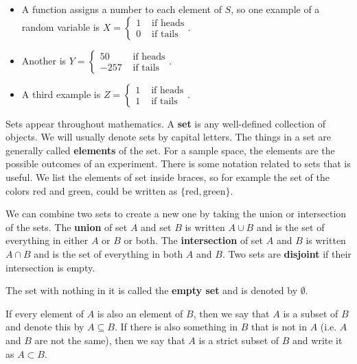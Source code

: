 \begin{frame}[allowframebreaks]
\begin{itemize}
\item A function assigns a number
to each element of $S$, so one example of a
random variable is $X = \begin{cases} 1 & \text{ if heads} \\
  0 & \text{ if tails} \end{cases}$. 

\item Another is
$Y = \begin{cases} 50 & \text{ if heads} \\
  -257 & \text{ if tails} \end{cases}$. 

\item A third example is
$Z = \begin{cases} 1 & \text{ if heads} \\
  1 & \text{ if tails} \end{cases}$.
\end{itemize}
\end{frame}

\begin{mdframed}[frametitle={Sets}]
Sets appear throughout mathematics. A \textbf{set} is any well-defined
collection of objects. We will usually denote sets by capital
letters. The things in a set are generally called \textbf{elements} of
the set. For a sample space, the elements are the possible outcomes of
an experiment. There is some notation related to sets that is
useful. We list the elements of set inside braces, so for example the
set of the colors red and green, could be written as
$\{\mathrm{red},\mathrm{green}\}$.

We can combine two sets to create a new one by taking the union or
intersection of the sets. The \textbf{union} of set $A$ and set $B$ is
written $A \cup B$ and is the set of everything in either $A$ or $B$
or both. The \textbf{intersection} of set $A$ and $B$ is written $A
\cap B$ and is the set of everything in both $A$ and $B$.  Two sets
are \textbf{disjoint} if their intersection is empty.

The set with nothing in it is called the \textbf{empty set} and is
denoted by $\emptyset$.
      
If every element of $A$ is also an element of $B$, then we say that
$A$ is a subset of $B$ and denote this by $A \subseteq B$. If there is
also something in $B$ that is not in $A$ (i.e. $A$ and $B$ are not the
same), then we say that $A$ is a strict subset of $B$ and write it as
$A \subset B$.
\end{mdframed}


